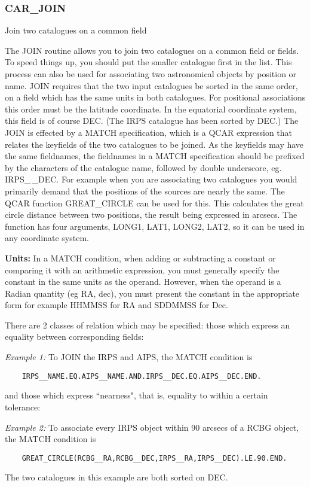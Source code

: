 \subsubsection{CAR\_JOIN}

Join two catalogues on a common field

The JOIN routine allows you to join two catalogues on a common field
or fields.
To speed things up, you should put the smaller catalogue first in the list.
This process can also be used for associating two astronomical objects by
position or name.
JOIN requires that the two input catalogues be sorted in the same order,
on a field which has the same units in both catalogues.
For positional associations this order must be the latitude coordinate.
In the equatorial coordinate system, this field is of course DEC.
(The IRPS catalogue has been sorted by DEC.)
The JOIN is effected by a MATCH specification, which is a QCAR expression
that relates the keyfields of the two catalogues to be joined.
As the keyfields may have the same fieldnames, the fieldnames in a MATCH
specification should be prefixed by the characters of the catalogue
name, followed by double underscore, eg. IRPS\_\,\_DEC.
For example when you are associating two catalogues you would primarily
demand that the positions of the sources are nearly the same.
The QCAR function GREAT\_CIRCLE can be used for this.
This calculates the great circle distance between two positions, the result
being expressed in arcsecs.
The function has four arguments, LONG1, LAT1, LONG2, LAT2, so it can be
used in any coordinate system.

{\bf Units:} In a MATCH condition, when adding or subtracting a constant or
comparing it with an arithmetic expression, you must generally specify the
constant in the same units as the operand.
However, when the operand is a Radian quantity (eg RA, dec), you must present
the constant in the appropriate form for example HHMMSS for RA
and SDDMMSS for Dec.

There are 2 classes of relation which may be specified: those which express an
equality between corresponding fields:

{\em Example 1:}  To JOIN the IRPS and AIPS, the MATCH condition is
\begin{verbatim}
    IRPS__NAME.EQ.AIPS__NAME.AND.IRPS__DEC.EQ.AIPS__DEC.END.
\end{verbatim}
and those which express ``nearness", that is, equality to within a certain
tolerance:

{\em Example 2:} To associate every IRPS object within 90 arcsecs of
a RCBG object, the MATCH condition is
\begin{verbatim}
    GREAT_CIRCLE(RCBG__RA,RCBG__DEC,IRPS__RA,IRPS__DEC).LE.90.END.
\end{verbatim}
The two catalogues in this example are both sorted on DEC.

